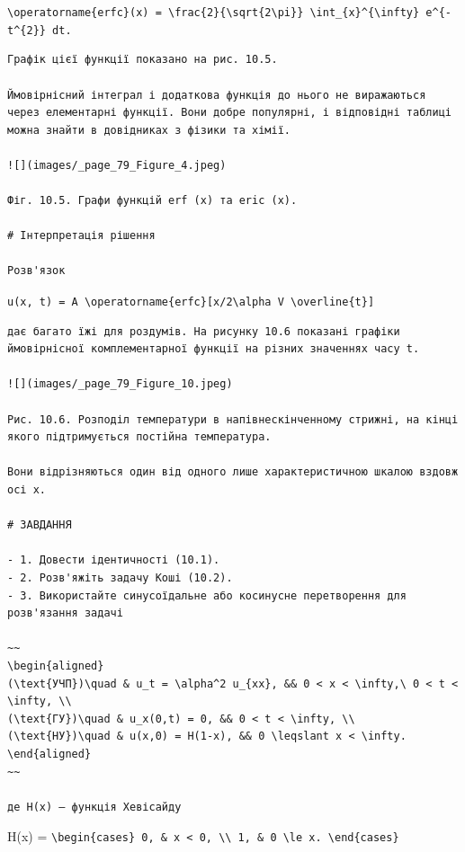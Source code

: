 \documentclass[
  ukrainian,
]{article}
\begin{document}
\texttt{\textbackslash{}operatorname\{erfc\}(x)\ =\ \textbackslash{}frac\{2\}\{\textbackslash{}sqrt\{2\textbackslash{}pi\}\}\ \textbackslash{}int\_\{x\}\^{}\{\textbackslash{}infty\}\ e\^{}\{-t\^{}\{2\}\}\ dt.}

\begin{verbatim}
Графік цієї функції показано на рис. 10.5.

Ймовірнісний інтеграл і додаткова функція до нього не виражаються через елементарні функції. Вони добре популярні, і відповідні таблиці можна знайти в довідниках з фізики та хімії.

![](images/_page_79_Figure_4.jpeg)

Фіг. 10.5. Графи функцій erf (x) та eric (x).

# Інтерпретація рішення

Розв'язок
\end{verbatim}

\texttt{u(x,\ t)\ =\ A\ \textbackslash{}operatorname\{erfc\}{[}x/2\textbackslash{}alpha\ V\ \textbackslash{}overline\{t\}{]}}

\begin{verbatim}
дає багато їжі для роздумів. На рисунку 10.6 показані графіки ймовірнісної комплементарної функції на різних значеннях часу t.

![](images/_page_79_Figure_10.jpeg)

Рис. 10.6. Розподіл температури в напівнескінченному стрижні, на кінці якого підтримується постійна температура.

Вони відрізняються один від одного лише характеристичною шкалою вздовж осі x.

# ЗАВДАННЯ

- 1. Довести ідентичності (10.1).
- 2. Розв'яжіть задачу Коші (10.2).
- 3. Використайте синусоїдальне або косинусне перетворення для розв'язання задачі

~~
\begin{aligned}
(\text{УЧП})\quad & u_t = \alpha^2 u_{xx}, && 0 < x < \infty,\ 0 < t < \infty, \\
(\text{ГУ})\quad & u_x(0,t) = 0, && 0 < t < \infty, \\
(\text{НУ})\quad & u(x,0) = H(1-x), && 0 \leqslant x < \infty.
\end{aligned}
~~

де H(x) — функція Хевісайду
\end{verbatim}

H(x) =
\texttt{\textbackslash{}begin\{cases\}\ 0,\ \&\ x\ \textless{}\ 0,\ \textbackslash{}\textbackslash{}\ 1,\ \&\ 0\ \textbackslash{}le\ x.\ \textbackslash{}end\{cases\}}
\end{document}
